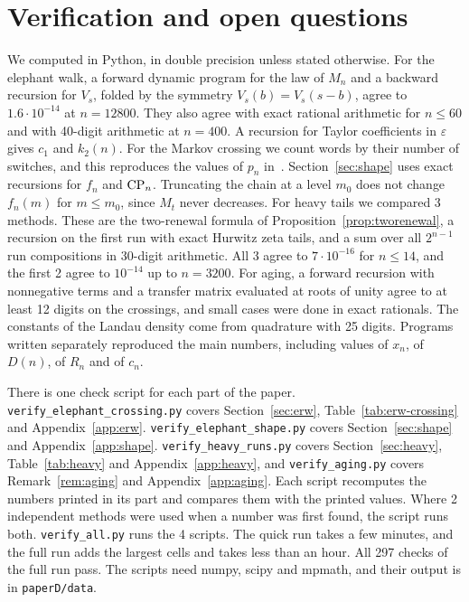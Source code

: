 \section{Verification and open questions}\label{sec:verify}

We computed in Python, in double precision unless stated otherwise. For
the elephant walk, a forward dynamic program for the law of $M_n$ and a
backward recursion for $V_s$, folded by the symmetry $V_s(b)=V_s(s-b)$,
agree to $1.6\cdot10^{-14}$ at $n=12800$. They also agree with exact
rational arithmetic for $n\le60$ and with 40-digit arithmetic at
$n=400$. A recursion for Taylor coefficients in $\varepsilon$ gives $c_1$
and $k_2(n)$. For the Markov crossing we count words by their number of
switches, and this reproduces the values of $p_n$ in~\cite{paperA}.
Section~\ref{sec:shape} uses exact recursions for $f_n$ and $\mathrm{CP}_n$.
Truncating the chain at a level $m_0$ does not change $f_n(m)$ for
$m\le m_0$, since $M_t$ never decreases. For heavy tails we compared 3
methods. These are the two-renewal formula of
Proposition~\ref{prop:tworenewal}, a recursion on the first run with exact
Hurwitz zeta tails, and a sum over all $2^{n-1}$ run compositions in
30-digit arithmetic. All 3 agree to $7\cdot10^{-16}$ for $n\le14$, and the
first 2 agree to $10^{-14}$ up to $n=3200$. For aging,
a forward recursion with nonnegative terms and a transfer matrix
evaluated at roots of unity agree to at least 12 digits on the crossings,
and small cases were done in exact rationals. The constants of the Landau
density come from quadrature with 25 digits. Programs written separately
reproduced the main numbers, including values of $x_n$, of $D(n)$, of
$R_n$ and of $c_n$.

There is one check script for each part of the paper.
\texttt{verify\_elephant\_crossing.py} covers Section~\ref{sec:erw},
Table~\ref{tab:erw-crossing} and Appendix~\ref{app:erw}.
\texttt{verify\_elephant\_shape.py} covers Section~\ref{sec:shape} and
Appendix~\ref{app:shape}. \texttt{verify\_heavy\_runs.py} covers
Section~\ref{sec:heavy}, Table~\ref{tab:heavy} and
Appendix~\ref{app:heavy}, and \texttt{verify\_aging.py} covers
Remark~\ref{rem:aging} and Appendix~\ref{app:aging}. Each script
recomputes the numbers printed in its part and compares them with the
printed values. Where 2 independent methods were used when a number was
first found, the script runs both. \texttt{verify\_all.py} runs the 4
scripts. The quick run takes a few minutes, and the full run adds the
largest cells and takes less than an hour. All 297 checks of the full run
pass. The scripts need numpy, scipy and mpmath, and their output is in
\texttt{paperD/data}.

